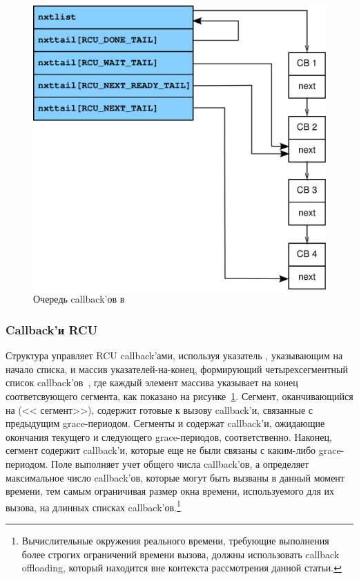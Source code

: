 \begin{figure}[tbp]
\centering
\includegraphics[scale=0.25]{rcu_data_callbacks.pdf}
\caption{Очередь callback'ов в }
\label{fig:rcu_data_callbacks}
\end{figure}

\subsubsection{Callback'и RCU}
Структура  управляет RCU callback'ами, используя указатель
, указывающим на начало списка, и массив 
указателей-на-конец, формирующий четырехсегментный список
callback'ов~\cite{LaiJiangshan2008NewClassicAlgorithm},
где каждый элемент массива  указывает на конец
соответсвующего сегмента, как показано на рисунке~\ref{fig:rcu_data_callbacks}.
Сегмент, оканчивающийся на 
(<< сегмент>>), содержит готовые к вызову callback'и,
связанные с предыдущим grace-периодом.
Сегменты  и 
содержат callback'и, ожидающие окончания текущего и следующего
grace-периодов, соответственно.
Наконец, сегмент  содержит callback'и,
которые еще не были связаны с каким-либо grace-периодом.
Поле  выполняет учет общего числа callback'ов,
а  определяет максимальное число callback'ов,
которые могут быть вызваны в данный момент времени, тем самым
ограничивая размер окна времени, используемого для их вызова,
на длинных списках callback'ов.\footnote{
  Вычислительные окружения реального времени, требующие выполнения
  более строгих ограничений времени вызова, должны использовать
  callback offloading, который находится вне контекста рассмотрения данной статьи.}

